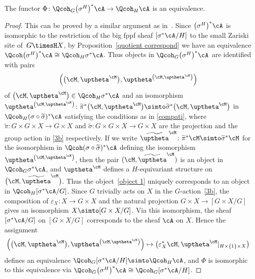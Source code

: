 \begin{lem}%
The functor $\Phi\colon \Qcoh _G\big(\sigma^H\big)^*\cA\to \Qcoh_H\cA$ is an equivalence.
\end{lem}
\begin{proof} This can be proved by a similar argument as in~\cite[Lemma~1.3]{tho}.
 Since $\big(\sigma^H\big)^*\cA$ is isomorphic to the restriction of the big fppf sheaf $[\sigma^*\cA/H]$ to the small Zariski site of~\mbox{$G\timesH X$}, by Proposition~\ref{quotient correspond} we have an equivalence $\Qcoh\big(\sigma^H\big)^*\cA\cong \Qcoh_H\sigma^*\cA$. Thus objects in $\Qcoh _G\big(\sigma^H\big)^*\cA$ are identified with pairs
\begin{equation}\label{object 1}
\Big(\big(\cM,\uptheta^{\cM}\big), \uptheta^{\left(\cM,\uptheta^{\cM}\right)}\Big)
\end{equation}
{\sloppy of $\big(\cM,\uptheta^{\cM}\big)\in \Qcoh_H\sigma^*\cA$ and an isomorphism $\uptheta^{\left(\cM,\uptheta^{\cM}\right)}\colon \widetilde{\pi}^*\big(\cM,\uptheta^{\cM}\big)\simto \widetilde{\sigma}^*\big(\cM,\uptheta^{\cM}\big)$ in $\Qcoh_H(\sigma\circ\widetilde{\sigma})^*\cA$ satisfying the conditions as in \eqref{compati}, where $\widetilde{\pi}\colon G\times G\times X\to G\times X$ and $\widetilde{\sigma}\colon G\times G\times X\to G\times X$ are the projection and the group action in \eqref{3b} respectively. If we write $\widetilde{\uptheta}^{\cM}\colon \widetilde{\pi}^*\cM\simto\widetilde{\sigma}^*\cM$ for the isomorphism in $\Qcoh(\sigma\circ\widetilde{\sigma})^*\cA$ defining the isomorphism $\uptheta^{\left(\cM,\uptheta^{\cM}\right)}$, then the pair $(\cM,\widetilde{\uptheta}^{\cM})$ is an object in $\Qcoh_G\sigma^*\cA$, and $\uptheta^{\cM}$ defines a $H$-equivariant structure on~$\big(\cM,\widetilde{\uptheta}^{\cM}\big)$. Thus the object~\eqref{object 1} uniquely corresponds to an object in $\Qcoh_H[\sigma^*\cA/G]$. Since $G$ trivially acts on $X$ in the $G$-action~\eqref{3b}, the composition of $\varepsilon_X\colon X\to G\times X$ and the natural projection $G\times X\to [G\times X/G]$ gives an isomorphism $ X\simto[G\times X/G]$. Via this isomorphism, the sheaf $[\sigma^*\cA/G]$ on $[G\times X/G]$ corresponds to the sheaf $\cA$ on $X$. Hence the assignment
 \begin{gather*}
 \Bigl(\big(\cM,\uptheta^{\cM}\big), \uptheta^{\left(\cM,\uptheta^{\cM}\right)}\Bigr)\mapsto \big(\varepsilon_X^*\cM,\uptheta^{\cM}|_{H\times \{1\}\times X}\big)
 \end{gather*}}\noindent
 defines an equivalence $\Qcoh_G[\sigma^*\cA/H]\simto \Qcoh_H\cA$, and $\Phi$ is isomorphic to this equivalence via $\Qcoh _G\big(\sigma^H\big)^*\cA\cong \Qcoh_G[\sigma^*\cA/H]$.
 \end{proof}


